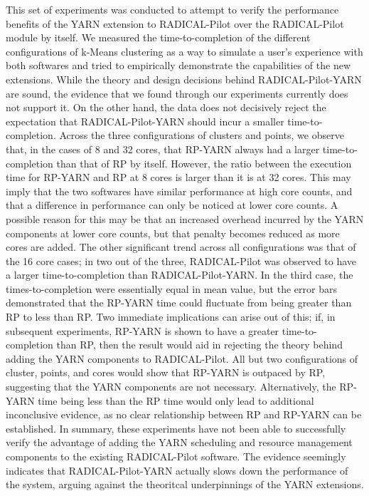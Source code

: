 \documentclass[]{article}
\begin{document}
	This set of experiments was conducted to attempt to verify the performance benefits of the YARN extension to RADICAL-Pilot over the RADICAL-Pilot module by itself. We measured the time-to-completion of the different configurations of k-Means clustering as a way to simulate a user's experience with both softwares and tried to empirically demonstrate the capabilities of the new extensions. While the theory and design decisions behind RADICAL-Pilot-YARN are sound, the evidence that we found through our experiments currently does not support it. On the other hand, the data does not decisively reject the expectation that RADICAL-Pilot-YARN should incur a smaller time-to-completion. Across the three configurations of clusters and points, we observe that, in the cases of 8 and 32 cores, that RP-YARN always had a larger time-to-completion than that of RP by itself. However, the ratio between the execution time for RP-YARN and RP at 8 cores is larger than it is at 32 cores. This may imply that the two softwares have similar performance at high core counts, and that a difference in performance can only be noticed at lower core counts. A possible reason for this may be that an increased overhead incurred by the YARN components at lower core counts, but that penalty becomes reduced as more cores are added. The other significant trend across all configurations was that of the 16 core cases; in two out of the three, RADICAL-Pilot was observed to have a larger time-to-completion than RADICAL-Pilot-YARN. In the third case, the times-to-completion were essentially equal in mean value, but the error bars demonstrated that the RP-YARN time could fluctuate from being greater than RP to less than RP. Two immediate implications can arise out of this; if, in subsequent experiments, RP-YARN is shown to have a greater time-to-completion than RP, then the result would aid in rejecting the theory behind adding the YARN components to RADICAL-Pilot. All but two configurations of cluster, points, and cores would show that RP-YARN is outpaced by RP, suggesting that the YARN components are not necessary. Alternatively, the RP-YARN time being less than the RP time would only lead to additional inconclusive evidence, as no clear relationship between RP and RP-YARN can be established. In summary, these experiments have not been able to successfully verify the advantage of adding the YARN scheduling and resource management components to the existing RADICAL-Pilot software. The evidence seemingly indicates that RADICAL-Pilot-YARN actually slows down the performance of the system, arguing against the theoritcal underpinnings of the YARN extensions.
\end{document}
